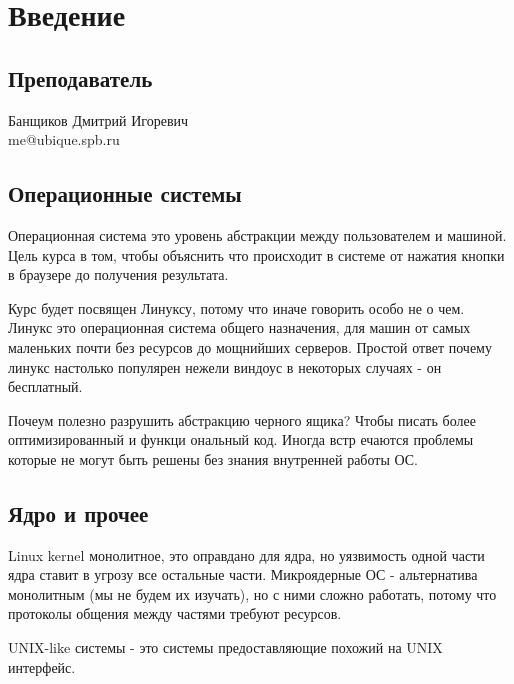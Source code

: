 \documentclass[../lectures.tex]{subfiles}
\begin{document}
\chapter{Введение}

\section{Преподаватель}
Банщиков Дмитрий Игоревич \\
me@ubique.spb.ru

\section{Операционные системы}
Операционная система это уровень абстракции между пользователем и машиной.
Цель курса в том, чтобы объяснить что происходит в системе от нажатия кнопки в
браузере до получения результата.

Курс будет посвящен Линуксу, потому что иначе говорить особо не о чем. Линукс
это операционная система общего назначения, для машин от самых маленьких почти
без ресурсов до мощнийших серверов. Простой ответ почему линукс настолько
популярен нежели виндоус в некоторых случаях - он бесплатный.

Почеум полезно разрушить абстракцию черного ящика? Чтобы писать более
оптимизированный и функци ональный код. Иногда встр ечаются проблемы которые не
могут быть решены без знания внутренней работы ОС.

\section{Ядро и прочее}
Linux kernel монолитное, это оправдано для ядра, но уязвимость одной части ядра
ставит в угрозу все остальные части.
Микроядерные ОС - альтернатива монолитным (мы не будем их изучать), но с ними
сложно работать, потому что протоколы общения между частями требуют ресурсов.

UNIX-like системы - это системы предоставляющие похожий на UNIX интерфейс.
\end{document}
